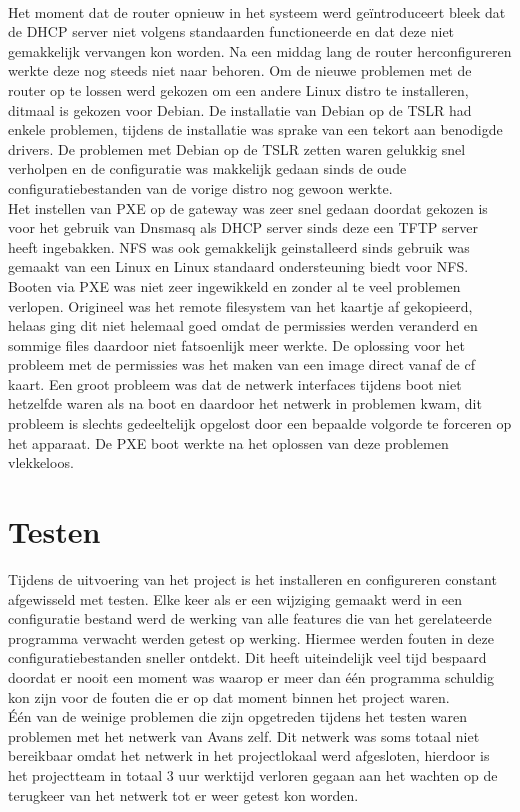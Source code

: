 \documentclass[12pt]{article}
\begin{document}
\\Het moment dat de router opnieuw in het systeem werd ge\"introduceert bleek dat de DHCP server niet volgens standaarden functioneerde en dat deze niet gemakkelijk vervangen kon worden. Na een middag lang de router herconfigureren werkte deze nog steeds niet naar behoren. Om de nieuwe problemen met de router op te lossen werd gekozen om een andere Linux distro te installeren, ditmaal is gekozen voor Debian. De installatie van Debian op de TSLR had enkele problemen, tijdens de installatie was sprake van een tekort aan benodigde drivers. De problemen met Debian op de TSLR zetten waren gelukkig snel verholpen en de configuratie was makkelijk gedaan sinds de oude configuratiebestanden van de vorige distro nog gewoon werkte.
\\Het instellen van PXE op de gateway was zeer snel gedaan doordat gekozen is voor het gebruik van Dnsmasq als DHCP server sinds deze een TFTP server heeft ingebakken. NFS was ook gemakkelijk geinstalleerd sinds gebruik was gemaakt van een Linux en Linux standaard ondersteuning biedt voor NFS.
\\Booten via PXE was niet zeer ingewikkeld en zonder al te veel problemen verlopen. Origineel was het remote filesystem van het kaartje af gekopieerd, helaas ging dit niet helemaal goed omdat de permissies werden veranderd en sommige files daardoor niet fatsoenlijk meer werkte. De oplossing voor het probleem met de permissies was het maken van een image direct vanaf de cf kaart. Een groot probleem was dat de netwerk interfaces tijdens boot niet hetzelfde waren als na boot en daardoor het netwerk in problemen kwam, dit probleem is slechts gedeeltelijk opgelost door een bepaalde volgorde te forceren op het apparaat. De PXE boot werkte na het oplossen van deze problemen vlekkeloos.
\\
\section{Testen}
Tijdens de uitvoering van het project is het installeren en configureren constant afgewisseld met testen. Elke keer als er een wijziging gemaakt werd in een configuratie bestand werd de werking van alle features die van het gerelateerde programma verwacht werden getest op werking. Hiermee werden fouten in deze configuratiebestanden sneller ontdekt. Dit heeft uiteindelijk veel tijd bespaard doordat er nooit een moment was waarop er meer dan \'e\'en programma schuldig kon zijn voor de fouten die er op dat moment binnen het project waren.\\
\'E\'en van de weinige problemen die zijn opgetreden tijdens het testen waren problemen met het netwerk van Avans zelf. Dit netwerk was soms totaal niet bereikbaar omdat het netwerk in het projectlokaal werd afgesloten, hierdoor is het projectteam in totaal 3 uur werktijd verloren gegaan aan het wachten op de terugkeer van het netwerk tot er weer getest kon worden.
\end{document}
